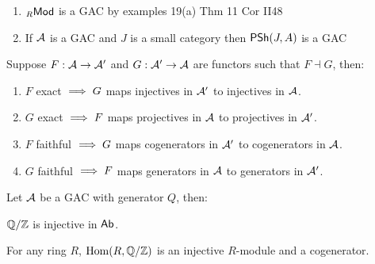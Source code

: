 \documentclass[a4paper]{report}
\begin{document}
\begin{exmp}
\begin{enumerate}
  \item ${}_R\mathsf{Mod}$ is a GAC by examples 19(a) Thm 11 Cor II48
  \item If $\mathcal{A}$ is a GAC and $J$ is a small category then $\mathsf{PSh}(J,A)$ is a GAC
\end{enumerate}
\end{exmp}
\begin{lemm}
  Suppose $F: \mathcal{A} \to \mathcal{A}'$ and $G: \mathcal{A}' \to \mathcal{A}$ are functors such that $F \dashv G$, then:
  \begin{enumerate}
\item $F$ exact $\implies G$ maps injectives in $\mathcal{A}'$ to injectives in $\mathcal{A}$.
\item $G$ exact $\implies F$ maps projectives in $\mathcal{A}$ to projectives in $\mathcal{A}'$.
\item $F$ faithful $\implies G$ maps cogenerators in $\mathcal{A}'$ to cogenerators in $\mathcal{A}$.
\item $G$ faithful $\implies F$ maps generators in $\mathcal{A}$ to generators in $\mathcal{A}'$.
  \end{enumerate}
\end{lemm}
\begin{thm}
  Let $\mathcal{A}$ be a GAC with generator $Q$, then:
\end{thm}
\begin{cor}
$\fak \Q\Z$ is injective in $\mathsf{Ab}$.
\end{cor}
\begin{cor}
  For any ring $R$, $\Hom(R, \fak \Q\Z)$ is an injective $R$-module and a cogenerator.
\end{cor}
\end{document}
